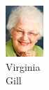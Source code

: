 \begin{figure}[H]
\begin{subfigure}[b]{0.1\textwidth}
                \includegraphics[width=\textwidth]{mugs/GillVirginia}
                \caption*{Virginia \\ Gill}
        \end{subfigure}
                        ~ %
        \begin{subfigure}[b]{0.1\textwidth}

\end{subfigure}
\end{figure}
